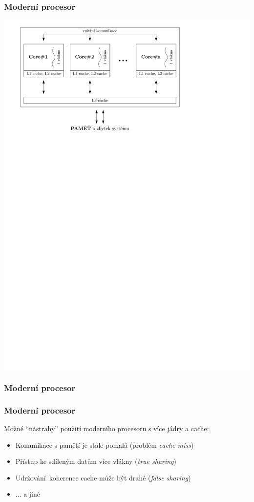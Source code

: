 \documentclass[usenames,dvipsnames,9pt]{beamer}
\begin{document}
\begin{frame}
  \frametitle{Moderní procesor}
  \centering\includegraphics[width=0.8\linewidth]{01/figs/modern_cpu.pdf}
\end{frame}
\begin{frame}[t]
  \frametitle{Moderní procesor}
  \centering
\end{frame}
\begin{frame}
  \frametitle{Moderní procesor}
  Možné ``nástrahy'' použití moderního procesoru s více jádry a cache:
  \begin{itemize}
    \item Komunikace s pamětí je stále pomalá (problém \emph{cache-miss})
    \item Přístup ke sdíleným datům více vlákny (\emph{true sharing})
    \item Udržování koherence cache může být drahé (\emph{false sharing}) \\[2em]
    \item ... a jiné
  \end{itemize}
\end{frame}
\end{document}
